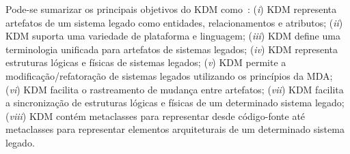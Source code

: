 Pode-se sumarizar os principais objetivos do KDM como~\cite{ADM:OMG}: (\textit{i}) KDM representa artefatos de um sistema legado como entidades, relacionamentos e atributos; (\textit{ii}) KDM suporta uma variedade de plataforma e linguagem; (\textit{iii}) KDM define uma terminologia unificada para artefatos de sistemas legados; (\textit{iv}) KDM representa estruturas lógicas e físicas de sistemas legados; (\textit{v}) KDM permite a modificação/refatoração de sistemas legados utilizando os princípios da MDA; (\textit{vi}) KDM facilita o rastreamento de mudança entre artefatos; (\textit{vii}) KDM facilita a sincronização de estruturas lógicas e físicas de um determinado sistema legado; (\textit{viii}) KDM contém metaclasses para representar desde código-fonte até metaclasses para representar elementos arquiteturais de um determinado sistema legado.


